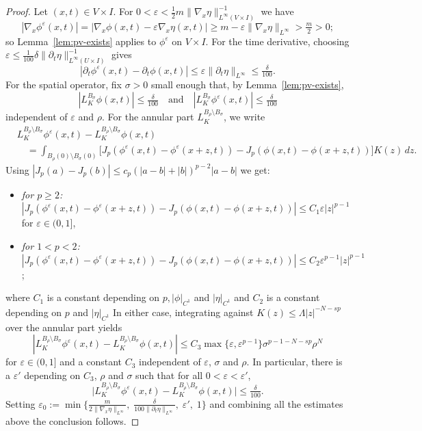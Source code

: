 \documentclass[10pt,a4paper]{amsart}
\begin{document}
\begin{proof}
Let $(x,t) \in V \times I$. For $0<\varepsilon < \tfrac{1}{2}m\|\nabla_x\eta\|_{L^\infty(V
\times I)}^{-1}$ we have
\[
  |\nabla_x\phi^\varepsilon(x,t)|
  = |\nabla_x\phi(x,t) - \varepsilon\nabla_x\eta(x,t)|
  \ge m - \varepsilon\|\nabla_x\eta\|_{L^\infty}
  > \tfrac{m}{2} > 0;
\]
so Lemma~\ref{lem:pv-exists} applies to
$\phi^\varepsilon$ on $V \times I$. For the time
derivative, choosing
$\varepsilon \le \tfrac{1}{100}\delta\|\partial_t\eta\|_{L^\infty(U
\times I)}^{-1}$ gives
\[
  |\partial_t\phi^\varepsilon(x,t) -  \partial_t\phi(x,t)| \leq
   \varepsilon\|\partial_t\eta\|_{L^\infty}
  \leq \tfrac{\delta}{100}.
\]
For the spatial operator, fix $\sigma > 0$ small enough
that, by Lemma~\ref{lem:pv-exists},
\[
  |L_K^{B_\sigma}\phi(x,t)| \le \tfrac{\delta}{100}
  \quad \text{and} \quad
  |L_K^{B_\sigma}\phi^\varepsilon(x,t)|
  \le \tfrac{\delta}{100}
\]
 independent of $\varepsilon$ and $\rho$.  For the annular part
$L_K^{B_\rho \setminus B_\sigma}$, we write
\begin{align*}
  &L_K^{B_\rho \setminus B_\sigma}
    \phi^\varepsilon(x,t)
  - L_K^{B_\rho \setminus B_\sigma}\phi(x,t) \\
  &\quad = \int_{B_\rho(0) \setminus B_\sigma(0)}
    \bigl[J_p(\phi^\varepsilon(x,t)
           -\phi^\varepsilon(x+z,t))
    - J_p(\phi(x,t)-\phi(x+z,t))\bigr]
    K(z)\,dz.
\end{align*}
 Using $|J_p(a) - J_p(b)| \le c_p(|a-b| + |b|)^{p-2}|a-b|$ we get:
\begin{itemize}
  \item \emph{for $p \ge 2$:}
    $|J_p(\phi^\varepsilon(x,t)
           -\phi^\varepsilon(x+z,t))
    - J_p(\phi(x,t)-\phi(x+z,t))|
    \le C_1\varepsilon|z|^{p-1}$ for $ \varepsilon \in (0,1]$,
  \item \emph{for $1 < p < 2$:}
    $|J_p(\phi^\varepsilon(x,t)
           -\phi^\varepsilon(x+z,t))
    - J_p(\phi(x,t)-\phi(x+z,t))|
    \le C_2\varepsilon^{p-1}|z|^{p-1}$;
\end{itemize}
where $C_1$ is a constant depending on $p,|\phi|_{C^1}$ and $|\eta|_{C^1}$ and $C_2$ is a constant depending on $p$ and $ |\eta|_{C^1}$  In either case, integrating against
$K(z) \le \Lambda|z|^{-N-sp}$ over the annular part yields
\[
|L_K^{B_\rho \setminus B_\sigma}
    \phi^\varepsilon(x,t)
  - L_K^{B_\rho \setminus B_\sigma}\phi(x,t) | \leq C_3\max\{\varepsilon, \varepsilon^{p-1}\}\sigma^{p-1-N-sp}\rho^{N}
\]
for $ \varepsilon \in (0,1]$ and a constant $C_3$ independent of $\varepsilon$, $\sigma$ and $\rho$. In particular, there is a $\varepsilon'$ depending on $C_3$, $\rho$ and $\sigma$ such that for all $0 < \varepsilon < \varepsilon'$,
\[
  \bigl|L_K^{B_\rho \setminus B_\sigma}
    \phi^\varepsilon(x,t)
  - L_K^{B_\rho \setminus B_\sigma}\phi(x,t)\bigr|
  \le \tfrac{\delta}{100}.
\]
Setting
$\varepsilon_0 := \min\bigl\{
  \tfrac{m}{2\|\nabla_x\eta\|_{L^\infty}},\;
  \tfrac{\delta}{100\|\partial_t\eta\|_{L^\infty}},\;
  \varepsilon',\; 1\bigr\}$
and combining all the estimates above the conclusion follows. 
\end{proof}
\end{document}
